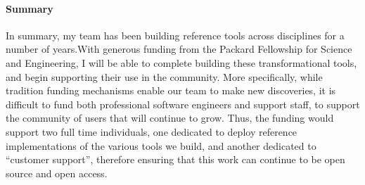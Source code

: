 \documentclass[11pt]{article}
\renewcommand{\para}[1]{\vspace{-10pt}\fontsize{10pt}{0pt}\paragraph{#1}}
\begin{document}

\para{Summary}
%
In summary, my team has been building reference tools across disciplines for a number of years.With generous funding from the Packard Fellowship for Science and Engineering, I will be able to complete building these transformational tools, and begin supporting their use in the community. More specifically, while tradition funding mechanisms enable our team to make new discoveries, it is difficult to fund both professional software engineers and support staff, to support the community of users that will continue to grow. Thus, the funding would support two full time individuals, one dedicated to deploy reference implementations of the various tools we build, and another dedicated to ``customer support'', therefore ensuring that this work can continue to be open source and open access.






\clearpage
\small{
\renewcommand{\section}[2]{}%

}


\end{document}
